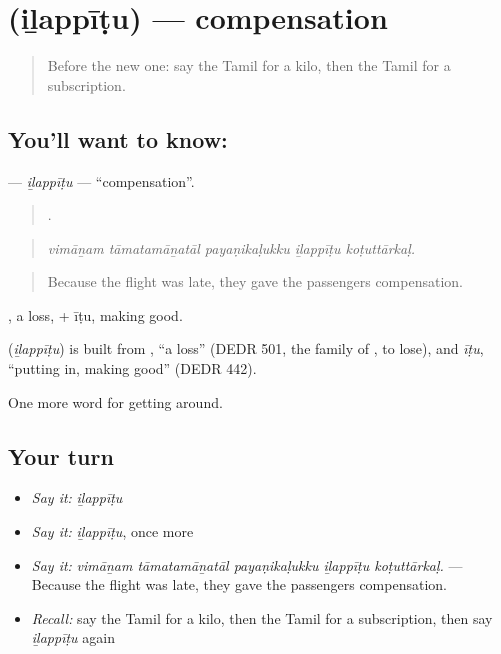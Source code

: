 \section[\texorpdfstring{\ta{இழப்பீடு} (iḻappīṭu)}{இழப்பீடு (iḻappīṭu)}]{ (iḻappīṭu) — compensation}

\label{lesson:TA-C451-ilappitu}



\begin{quote}
Before the new one: say the Tamil for a kilo, then the Tamil for a subscription.
\end{quote}

\subsection*{You'll want to know: }
\textbf{} — \emph{iḻappīṭu} — \textquotedblleft{}compensation\textquotedblright{}.

\begin{quote}
    .
\end{quote}

\begin{quote}
\emph{vimāṉam tāmatamāṉatāl payaṇikaḷukku iḻappīṭu koṭuttārkaḷ.}
\end{quote}

\begin{quote}
Because the flight was late, they gave the passengers compensation.
\end{quote}

, a loss, + īṭu, making good.

\begin{cousinweb}
\textbf{} (\emph{iḻappīṭu}) is built from , \textquotedblleft{}a loss\textquotedblright{} (DEDR 501, the family of , to lose), and \emph{īṭu}, \textquotedblleft{}putting in, making good\textquotedblright{} (DEDR 442).
\end{cousinweb}

\begin{grammarlens}[title={What you've built}]
One more word for getting around.
\end{grammarlens}

\subsection*{Your turn}
\begin{itemize}
\raggedright
  \item \emph{Say it:} \emph{iḻappīṭu}
  \item \emph{Say it:} \emph{iḻappīṭu}, once more
  \item \emph{Say it:} \emph{vimāṉam tāmatamāṉatāl payaṇikaḷukku iḻappīṭu koṭuttārkaḷ.} — Because the flight was late, they gave the passengers compensation.
  \item \emph{Recall:} say the Tamil for a kilo, then the Tamil for a subscription, then say \emph{iḻappīṭu} again
\end{itemize}

